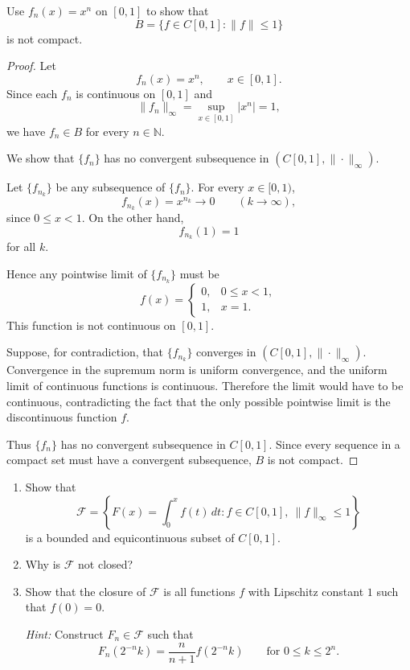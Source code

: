 \begin{problem}
    
    Use \(f_n(x)=x^n\) on \([0,1]\) to show that
    \[
    B=\{f\in C[0,1]:\|f\|\le 1\}
    \]
    is not compact.
    
\end{problem}
\begin{proof}
    Let
    \[
        f_n(x)=x^n , \qquad x\in [0,1].
    \]
    Since each \(f_n\) is continuous on \([0,1]\) and
    \[
        \|f_n\|_\infty
        =\sup_{x\in[0,1]} |x^n|
        =1,
    \]
    we have \(f_n\in B\) for every \(n\in\mathbb{N}\).

    We show that \(\{f_n\}\) has no convergent subsequence in
    \((C[0,1],\|\cdot\|_\infty)\).

    Let \(\{f_{n_k}\}\) be any subsequence of \(\{f_n\}\).
    For every \(x\in [0,1)\),
    \[
        f_{n_k}(x)=x^{n_k}\to 0
        \qquad (k\to\infty),
    \]
    since \(0\le x<1\). On the other hand,
    \[
        f_{n_k}(1)=1
    \]
    for all \(k\).

    Hence any pointwise limit of \(\{f_{n_k}\}\) must be
    \[
        f(x)=
        \begin{cases}
            0, & 0\le x<1,\\
            1, & x=1.
        \end{cases}
    \]
    This function is not continuous on \([0,1]\).

    Suppose, for contradiction, that \(\{f_{n_k}\}\) converges in
    \((C[0,1],\|\cdot\|_\infty)\).
    Convergence in the supremum norm is uniform convergence, and the
    uniform limit of continuous functions is continuous.
    Therefore the limit would have to be continuous, contradicting the
    fact that the only possible pointwise limit is the discontinuous
    function \(f\).

    Thus \(\{f_n\}\) has no convergent subsequence in \(C[0,1]\).
    Since every sequence in a compact set must have a convergent
    subsequence, \(B\) is not compact.
\end{proof}

\begin{problem}

    \vphantom{}
    \begin{enumerate}
    \item[(a)] Show that
    \[
    \mathcal{F}
    =
    \left\{
    F(x)=\int_0^x f(t)\,dt:
    f\in C[0,1],\ \|f\|_\infty\le 1
    \right\}
    \]
    is a bounded and equicontinuous subset of \(C[0,1]\).
    
    \item[(b)] Why is \(\mathcal{F}\) not closed?
    
    \item[(c)] Show that the closure of \(\mathcal{F}\) is all functions \(f\) with
    Lipschitz constant \(1\) such that \(f(0)=0\).
    
    \emph{Hint:} Construct \(F_n\in\mathcal{F}\) such that
    \[
    F_n(2^{-n}k)
    =
    \frac{n}{n+1}f(2^{-n}k)
    \qquad
    \text{for }0\le k\le 2^n.
    \]
    \end{enumerate}
    
\end{problem}

